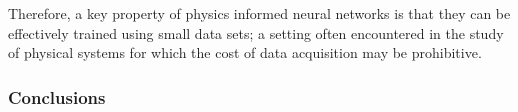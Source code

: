 \documentclass{beamer}
\begin{document}
\begin{frame}

Therefore, a key property of physics informed neural networks is that they can
be effectively trained using small data sets; a setting often encountered in the
study of physical systems for which the cost of data acquisition may be
prohibitive.
    
\end{frame}


\begin{frame}
    \frametitle{Conclusions}

\end{frame}




\end{document}
